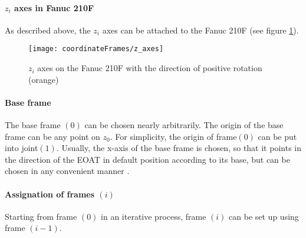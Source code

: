 \paragraph{$z_i$ axes in Fanuc 210F}
As described above, the $z_i$ axes can be attached to the Fanuc 210F (see figure \ref{fig:zi_Axes}).

\begin{figure}[H]
	\texttt{[image: coordinateFrames/z\_axes]}
	\caption{$z_i$ axes on the Fanuc 210F with the direction of positive rotation (orange)}
	\label{fig:zi_Axes}
\end{figure}

\paragraph{Base frame}

The base frame $(0)$ can be chosen nearly arbitrarily. The origin of the base frame can be any point on $z_0$. For simplicity, the origin of frame$(0)$ can be put into joint$(1)$.  Usually, the x-axis of the base frame is chosen, so that it points in the direction of the \ac{EOAT} in default position according to its base, \cite{DenavitHartenbergKonventionen} but can be chosen in any convenient manner \cite{SpongDynContr}.

\paragraph{Assignation of frames $(i)$}

Starting from frame $(0)$ in an iterative process, frame $(i)$ can be set up using frame $(i-1)$.

